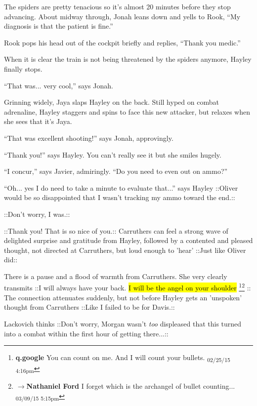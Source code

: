 The spiders are pretty tenacious so it's almost 20 minutes before they stop advancing.  About midway through, Jonah leans down and yells to Rook, ``My diagnosis is that the patient is fine.''

Rook pops his head out of the cockpit briefly and replies, ``Thank you medic.''

When it is clear the train is not being threatened by the spiders anymore, Hayley finally stops.

``That was... very cool,'' says Jonah.

Grinning widely, Jaya slaps Hayley on the back.  Still hyped on combat adrenaline, Hayley staggers and spins to face this new attacker, but relaxes when she sees that it's Jaya. 

``That was excellent shooting!'' says Jonah, approvingly.

``Thank you!'' says Hayley.  You can't really see it but she smiles hugely.

``I concur,'' says Javier, admiringly.  ``Do you need to even out on ammo?''

``Oh... yes I do need to take a minute to evaluate that...'' says Hayley  {\color[RGB]{255,153,0}::Oliver would be so disappointed that I wasn't tracking my ammo toward the end.::} 

 {\color[RGB]{153,0,255}::Don't worry, I was.::} 

 {\color[RGB]{255,153,0}::Thank you!  That is so nice of you.::}  Carruthers can feel a strong wave of delighted surprise and gratitude from Hayley, followed by a contented and pleased thought, not directed at Carruthers, but loud enough to 'hear'  {\color[RGB]{255,153,0}::Just like Oliver did:: } 

There is a pause and a flood of warmth from Carruthers. She very clearly transmits  {\color[RGB]{153,0,255}::I will always have your back. }  {\color[RGB]{153,0,255}\hl{I will be the angel on your shoulder}} \footnote{\textbf{q.google }You can count on me.  And I will count your bullets. \textsubscript{02/25/15 4:16pm}}\footnote{$\rightarrow$\textbf{Nathaniel Ford }I forget which is the archangel of bullet counting... \textsubscript{03/09/15 5:15pm}} {\color[RGB]{153,0,255}::}  The connection attenuates suddenly, but not before Hayley gets an 'unspoken' thought from Carruthers  {\color[RGB]{153,0,255}::Like I failed to be for Davis.::} 



Lackovich thinks  {\color[RGB]{74,134,232}::Don't worry, Morgan wasn't } \textit{ {\color[RGB]{74,134,232}too} } {\color[RGB]{74,134,232} displeased that this turned into a combat within the first hour of getting there...::} 

